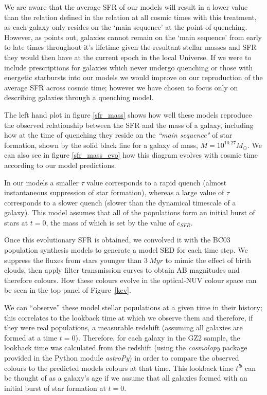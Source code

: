 \documentclass{mn2e}
\begin{document}
We are aware that the average SFR of our models will result in a lower value than the relation defined in the \citet{Peng} relation at all cosmic times with this treatment, as each galaxy only resides on the `main sequence' at the point of quenching. However, as \citet{Beth} points out, galaxies cannot remain on the `main sequence' from early to late times throughout it's lifetime given the resultant stellar masses and SFR they would then have at the current epoch in the local Universe. If we were to include prescriptions for galaxies which never undergo quenching or those with energetic starbursts into our models we would improve on our reproduction of the average SFR across cosmic time; however we have chosen to focus only on describing galaxies through a quenching model. 

The left hand plot in figure \ref{sfr_mass} shows how well these models reproduce the observed relationship between the SFR and the mass of a galaxy, including how at the time of quenching they reside on the \emph{``main sequence"} of star formation, shown by the solid black line for a galaxy of mass, $M = 10^{10.27} M_{\odot}$.  We can also see in figure \ref{sfr_mass_evo} how this diagram evolves with cosmic time according to our model predictions. 



In our models a smaller $\tau$ value corresponds to a rapid quench (almost instantaneous suppression of star formation), whereas a large value of $\tau$ corresponds to a slower quench (slower than the dynamical timescale of a galaxy).  This model assumes that all of the populations form an initial burst of stars at $t=0$, the mass of which is set by the value of $c_{SFR}$. %

Once this evolutionary SFR is obtained, we convolved it with the BC03 population synthesis models to generate a model SED for each time step. We suppress the fluxes from stars younger than $3~Myr$ to mimic the effect of birth clouds, then apply filter transmission curves to obtain AB magnitudes and therefore colours. How these colours evolve in the optical-NUV colour space can be seen in the top panel of Figure~\ref{kev}.


We can ``observe'' these model stellar populations at a given time in their history; this correlates to the lookback time at which we observe them and therefore, if they were real populations, a measurable redshift (assuming all galaxies are formed at a time $t=0$). Therefore, for each galaxy in the GZ2 sample, the lookback time was calculated from the redshift (using the \emph{cosmolopy} package provided in the Python module \emph{astroPy}) in order to compare the observed colours to the predicted models colours at that time. This lookback time $t^{lb}$ can be thought of as a galaxy's age if we assume that all galaxies formed with an initial burst of star formation at $t=0$. 
\end{document}
